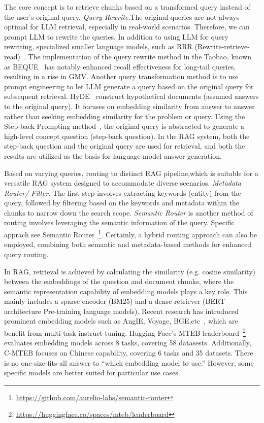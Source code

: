 The core concept is to retrieve chunks based on a transformed query instead of the user’s original query.
\emph{Query Rewrite}.The original queries are not always optimal for LLM retrieval, especially in real-world scenarios. Therefore, we can prompt LLM to rewrite the queries. In addition to using LLM for query rewriting, specialized smaller language models, such as RRR (Rewrite-retrieve-read)~. The implementation of the query rewrite method in the Taobao, known as BEQUE~ has notably enhanced recall effectiveness for long-tail queries, resulting in a rise in GMV.
Another query transformation method is to use prompt engineering to let LLM generate a query based on the original query for subsequent retrieval. HyDE~ construct  hypothetical documents  (assumed answers to the original query). It focuses on embedding similarity from answer to answer rather than seeking embedding similarity for the problem or query. Using the Step-back Prompting method~, the original query is abstracted to generate a high-level concept question (step-back question). In the RAG system, both the step-back question and the original query are used for retrieval, and both the results are utilized as the basis for language model answer generation.

Based on varying queries, routing to distinct RAG pipeline,which is suitable for a versatile RAG system designed to accommodate diverse scenarios.
\emph{Metadata Router/ Filter}. The first step involves extracting keywords (entity) from the query, followed by filtering based on the keywords and metadata within the chunks to narrow down the search scope.
\emph{Semantic Router} is another method of routing involves leveraging the semantic information of the query. Specific apprach see Semantic Router~\footnote{\url{https://github.com/aurelio-labs/semantic-router}}. Certainly, a hybrid routing approach can also be employed, combining both semantic and metadata-based methods for enhanced query routing.

In RAG, retrieval is achieved by calculating the similarity (e.g. cosine similarity) between the embeddings of the question and document chunks, where the semantic representation capability of embedding models plays a key role. This mainly includes a sparse encoder (BM25) and a dense retriever (BERT architecture Pre-training language models). Recent research has introduced prominent embedding models such as AngIE, Voyage, BGE,etc~, which are benefit from multi-task instruct tuning. Hugging Face’s MTEB leaderboard~\footnote{\url{https://huggingface.co/spaces/mteb/leaderboard}} evaluates embedding models across 8 tasks, covering 58 datasests. Additionally, C-MTEB  focuses on  Chinese capability, covering 6 tasks and 35 datasets. There is no one-size-fits-all answer to “which embedding model to use.” However,  some specific models are better suited for particular use cases.

